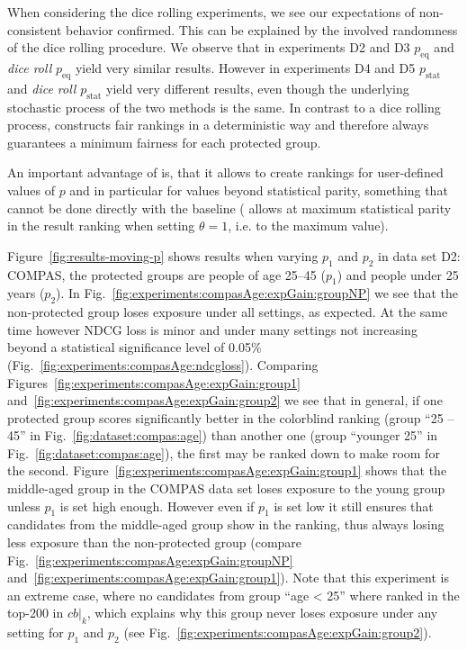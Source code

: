 When considering the dice rolling experiments, we see our expectations of non-consistent behavior confirmed. 
%
This can be explained by the involved randomness of the dice rolling procedure. 
%
We observe that in experiments D2 and D3 \algoFAIR $p_\text{eq}$ and \emph{dice roll} $p_\text{eq}$ yield very similar results.
%
However in experiments D4 and D5 \algoFAIR $p_\text{stat}$ and \emph{dice roll} $p_\text{stat}$ yield very different results, even though the underlying stochastic process of the two methods is the same.
%
In contrast to a dice rolling process, \algoFAIR constructs fair rankings in a deterministic way and therefore always guarantees a minimum fairness for each protected group. 

%
An important advantage of \algoFAIR is, that it allows to create rankings for user-defined values of $p$ and in particular for values beyond statistical parity, something that cannot be done directly with the baseline (\citet{zehlike2020matching} allows at maximum statistical parity in the result ranking when setting $\theta=1$, i.e. to the maximum value).

Figure~\ref{fig:results-moving-p} shows results when varying $p_1$ and $p_2$ in data set D2: COMPAS, the protected groups are people of age 25--45 ($p_1$) and people under 25 years ($p_2$).
%
In Fig.~\ref{fig:experiments:compasAge:expGain:groupNP} we see that the non-protected group loses exposure under all settings, as expected.
%
At the same time however NDCG loss is minor and under many settings not increasing beyond a statistical significance level of 0.05\% (Fig.~\ref{fig:experiments:compasAge:ndcgloss}).
%
Comparing Figures~\ref{fig:experiments:compasAge:expGain:group1} and~\ref{fig:experiments:compasAge:expGain:group2} we see that in general, if one protected group scores significantly better in the colorblind ranking (group ``25 -- 45'' in Fig.~\ref{fig:dataset:compas:age}) than another one (group ``younger 25'' in Fig.~\ref{fig:dataset:compas:age}), the first may be ranked down to make room for the second.
%
Figure~\ref{fig:experiments:compasAge:expGain:group1} shows that the middle-aged group in the COMPAS data set loses exposure to the young group unless $p_1$ is set high enough.
%
However even if $p_1$ is set low it still ensures that candidates from the middle-aged group show in the ranking, thus always losing less exposure than the non-protected group (compare Fig.~\ref{fig:experiments:compasAge:expGain:groupNP} and~\ref{fig:experiments:compasAge:expGain:group1}).
%
Note that this experiment is an extreme case, where no candidates from group ``age < 25'' where ranked in the top-200 in $cb|_k$, which explains why this group never loses exposure under any setting for $p_1$ and $p_2$ (see Fig.~\ref{fig:experiments:compasAge:expGain:group2}).

